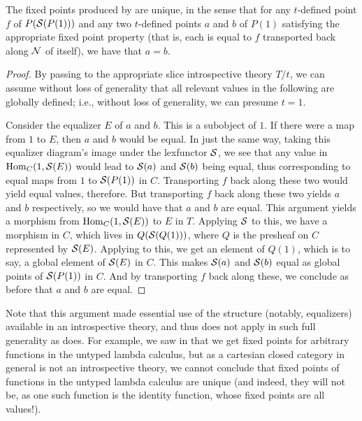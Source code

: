 \begin{theorem}\label{UniqueFixedPoints}
The fixed points produced by  are unique, in the sense that for any $t$-defined point $f$ of $P(\mathcal{S}(P(1)))$ and any two $t$-defined points $a$ and $b$ of $P(1)$ satisfying the appropriate fixed point property (that is, each is equal to $f$ transported back along $\mathcal{N}$ of itself), we have that $a = b$.
\end{theorem}
\begin{proof}
By passing to the appropriate slice introspective theory $T/t$, we can assume without loss of generality that all relevant values in the following are globally defined; i.e., without loss of generality, we can presume $t = 1$.

Consider the equalizer $E$ of $a$ and $b$. This is a subobject of $1$. If there were a map from $1$ to $E$, then $a$ and $b$ would be equal. In just the same way, taking this equalizer diagram's image under the lexfunctor $\mathcal{S}$, we see that any value in $\operatorname{Hom}_C(1, \mathcal{S}(E))$ would lead to $\mathcal{S}(a)$ and $\mathcal{S}(b)$ being equal, thus corresponding to equal maps from $1$ to $\mathcal{S}(P(1))$ in $C$. Transporting $f$ back along these two would yield equal values, therefore. But transporting $f$ back along these two yields $a$ and $b$ respectively, so we would have that $a$ and $b$ are equal. This argument yields a morphism from $\operatorname{Hom}_C(1, \mathcal{S}(E))$ to $E$ in $T$. Applying $\mathcal{S}$ to this, we have a morphism in $C$, which lives in $Q(\mathcal{S}(Q(1)))$, where $Q$ is the presheaf on $C$ represented by $\mathcal{S}(E)$. Applying  to this, we get an element of $Q(1)$, which is to say, a global element of $\mathcal{S}(E)$ in $C$. This makes $\mathcal{S}(a)$ and $\mathcal{S}(b)$ equal as global points of $\mathcal{S}(P(1))$ in $C$. And by transporting $f$ back along these, we conclude as before that $a$ and $b$ are equal. 
\end{proof}

\begin{observation}
Note that this argument made essential use of the structure (notably, equalizers) available in an introspective theory, and thus does not apply in such full generality as  does. For example, we saw in  that we get fixed points for arbitrary functions in the untyped lambda calculus, but as a cartesian closed category in general is not an introspective theory, we cannot conclude that fixed points of functions in the untyped lambda calculus are unique (and indeed, they will not be, as one such function is the identity function, whose fixed points are all values!).
\end{observation}

